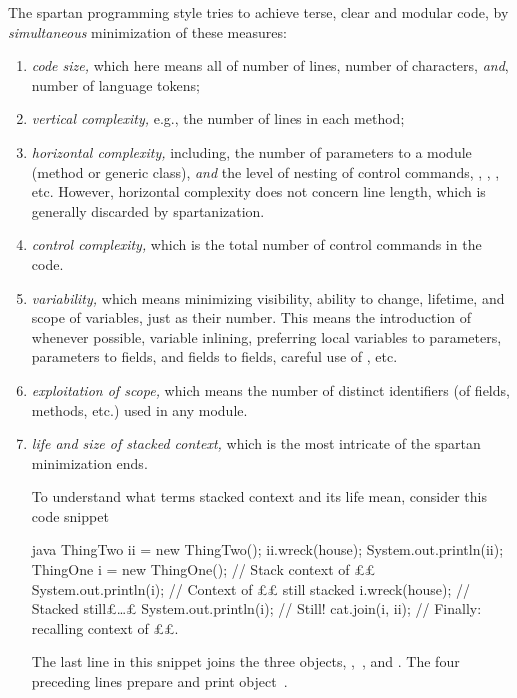 The spartan programming style tries to achieve terse, clear and modular code,
by \textit{simultaneous} minimization of these measures:
\begin{enumerate}
  \item \textit{code size,} which here means all of number of lines, number of
        characters, \emph{and}, number of language tokens;
  \item \textit{vertical complexity,} e.g., the number of lines in each
        method;
  \item \textit{horizontal complexity,} including, the number of parameters to a
        module (method or generic class), \emph{and} the level of nesting of
        control commands, , , , etc. However,
        horizontal complexity does not concern line length, which is generally
        discarded by spartanization.
  \item \textit{control complexity,} which is the total number of control
        commands in the code.
  \item \textit{variability,} which means minimizing visibility, ability to
        change, lifetime, and scope of variables, just as their number.
        This means the introduction of  whenever possible,
        variable inlining, preferring local variables to parameters, parameters
        to fields, and fields to  fields, careful use of
        , etc.
  \item \textit{exploitation of scope,} which means the number of distinct
        identifiers (of fields, methods, etc.) used in any module.
  \item \textit{life and size of stacked context,} which is the most intricate of the
        spartan minimization ends.

        To understand what terms stacked context and its life mean, consider
        this code snippet

        \begin{code}[minipage,width=54ex]{java}
ThingTwo ii = new ThingTwo();
ii.wreck(house);
System.out.println(ii);
ThingOne i = new ThingOne(); // Stack context of ££
System.out.println(i);       // Context of ££ still stacked
i.wreck(house);              // Stacked still£…£
System.out.println(i);       // Still!
cat.join(i, ii);             // Finally: recalling context of ££.
  \end{code}
  The last line in this snippet joins the three objects,
  ,~, and . The four preceding lines prepare
  and print object~.


\end{enumerate}
